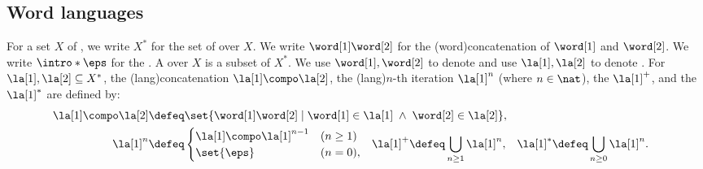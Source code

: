 \subsection{Word languages}
%
\AP
For a set $X$ of \intro*{}, we write $X^{*}$ for the set of \intro*{} over $X$.
\AP
We write $\word[1] \word[2]$ for the \intro*\kl(word){concatenation} of  $\word[1]$ and $\word[2]$.
\AP
We write $\intro*\eps$ for the \intro*{}.
\AP
A \intro*{} over $X$ is a subset of $X^{*}$.
\AP
We use $\word[1], \word[2]$ to denote  and use $\la[1], \la[2]$ to denote .
\AP
For  $\la[1], \la[2] \subseteq X^{*}$, the \intro*\kl(lang){concatenation} $\la[1] \compo \la[2]$,
the \intro*\kl(lang){$n$-th iteration} $\la[1]^n$ (where $n \in \nat$),
the \intro*{} $\la[1]^{+}$, and
the \intro*{} $\la[1]^{*}$ are defined by:
\begin{align*}
    \la[1] \compo \la[2] & \defeq \set{\word[1] \word[2] \mid \word[1] \in \la[1] \;\land\; \word[2] \in \la[2]},\hspace{-.1em}                    \span\span    \\
    \la[1]^{n} & \defeq \begin{cases}
        \la[1] \compo \la[1]^{n-1} & (n \ge 1)\\
        \set{\eps} & (n = 0),
    \end{cases}\hspace{-.1em} & 
    \la[1]^{+}  & \defeq \bigcup_{n \ge 1} \la[1]^{n},\hspace{-.1em}&
    \la[1]^{*}  & \defeq \bigcup_{n \ge 0} \la[1]^{n}.
\end{align*}

